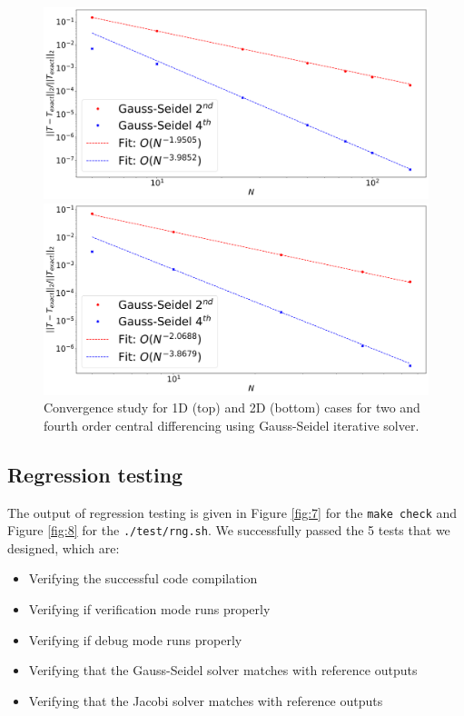 \documentclass[12pt]{amsart}   %
\begin{document}
\begin{enumerate}
    \begin{figure}[htbp!]
\begin{minipage}[htbp!]{\linewidth}
  \centering
    \includegraphics[width=\linewidth,keepaspectratio]{Project1photos/convergence_study_GS_1D.png}
\end{minipage}
\begin{minipage}[htbp!]{\linewidth}
  \centering
    \includegraphics[width=\linewidth,keepaspectratio]{Project1photos/convergence_study_GS_2D.png}
\end{minipage}
\caption{Convergence study for 1D (top) and 2D (bottom) cases for two and fourth order central differencing using Gauss-Seidel iterative solver.} \label{fig:convGS}
\end{figure}
\end{enumerate}

\subsection{Regression testing}
The output of regression testing is given in Figure \ref{fig:7} for the {\tt{make check}} and Figure \ref{fig:8} for the {\tt{./test/rng.sh}}. We successfully passed the 5 tests that we designed, which are: 
\begin{itemize}
    \item Verifying the successful code compilation
    \item Verifying if verification mode runs properly
    \item Verifying if debug mode runs properly
    \item Verifying that the Gauss-Seidel solver matches with reference outputs
    \item Verifying that the Jacobi solver matches with reference outputs
\end{itemize}
\end{document}
